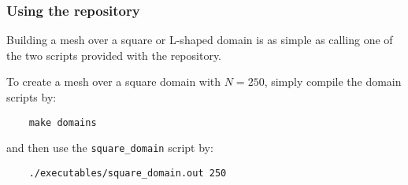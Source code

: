 \begin{frame}[fragile]
    \frametitle{Using the repository}

    Building a mesh over a square or L-shaped domain is as simple as calling one of the two scripts provided with the repository.

    To create a mesh over a square domain with $N = 250$, simply compile the domain scripts by:

    \begin{lstlisting}
    make domains
    \end{lstlisting}

    and then use the \lstinline{square_domain} script by:

    \begin{lstlisting}
    ./executables/square_domain.out 250
    \end{lstlisting}

\end{frame}
